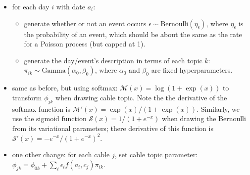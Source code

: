 \documentclass{article}
\begin{document}
\begin{itemize}
\item for each day $i$ with date $a_i$:
\begin{itemize}
\item generate whether or not an event occurs $\epsilon \sim \mbox{Bernoulli}(\eta_\epsilon)$, where $\eta_\epsilon$ is the probability of an event, which should be about the same as the rate for a Poisson process (but capped at 1).
\item generate the day/event's description in terms of each topic $k$: $\pi_{ik} \sim \mbox{Gamma}(\alpha_0, \beta_0)$, where $\alpha_0$ and $\beta_0$ are fixed hyperparameters.
\end{itemize}
\item same as before, but using softmax: $\mathcal{M}(x) = \log(1+\exp(x))$ to transform $\phi_{jk}$ when drawing cable topic.  Note the the derivative of the softmax function is $\mathcal{M}'(x) = \exp(x) / (1+\exp(x))$.  Similarly, we use the sigmoid function $\mathcal{S}(x) = 1/ (1+e^{-x})$ when drawing the Bernoulli from its variational parameters; there derivative of this function is $\mathcal{S}'(x) = -e^{-x}/ (1+e^{-x})^2$.
\item one other change: for each cable $j$, set cable topic parameter: $\phi_{jk} = \phi_{0k} + \sum_i \epsilon_i f(a_i, c_j) \pi_{ik}$.
\end{itemize}
\end{document}
